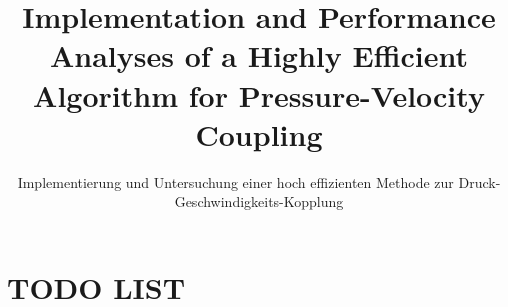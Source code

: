 \documentclass[article,type=msc,colorback,accentcolor=tud2a]{tudreport}
\begin{document}
\title{Implementation and Performance Analyses of a Highly Efficient Algorithm for Pressure-Velocity Coupling}
\subtitle{Implementierung und Untersuchung einer hoch effizienten Methode zur Druck-Geschwindigkeits-Kopplung}
  \maketitle
  
  \tableofcontents
  \listoffigures
  \listoftables
  \listofalgorithms



  \section*{TODO LIST}
\end{document}

